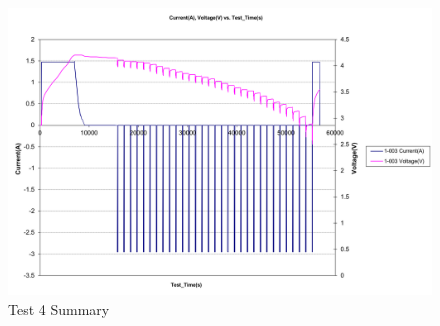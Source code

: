 \documentclass[]{aiaa-tc}%
\begin{document}
\begin{figure}[!htb]
	\centering
	\includegraphics[width=1.0\textwidth]{figures/SampleTest.png}
	\caption{Test 4 Summary}
	\label{fig:Test4Summary}
\end{figure}
\end{document}
